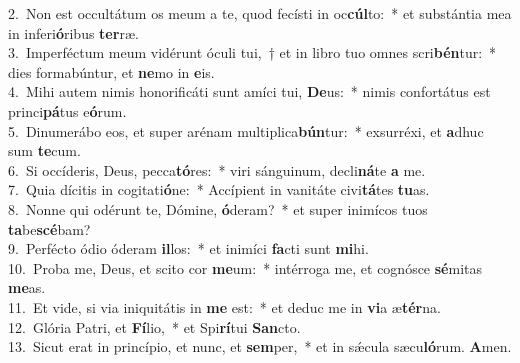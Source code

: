 {2.~}Non est occultátum os meum a te, quod fecísti in oc\textbf{cúl}to:~* et substántia mea in inferi\textbf{ó}ribus \textbf{ter}ræ.\\
{3.~}Imperféctum meum vidérunt óculi tui,~† et in libro tuo omnes scri\textbf{bén}tur:~* dies formabúntur, et \textbf{ne}mo in \textbf{e}is.\\
{4.~}Mihi autem nimis honorificáti sunt amíci tui, \textbf{De}us:~* nimis confortátus est princi\textbf{pá}tus e\textbf{ó}rum.\\
{5.~}Dinumerábo eos, et super arénam multiplica\textbf{bún}tur:~* exsurréxi, et \textbf{a}dhuc sum \textbf{te}cum.\\
{6.~}Si occíderis, Deus, pecca\textbf{tó}res:~* viri sánguinum, decli\textbf{ná}te \textbf{a} me.\\
{7.~}Quia dícitis in cogitati\textbf{ó}ne:~* Accípient in vanitáte civi\textbf{tá}tes \textbf{tu}as.\\
{8.~}Nonne qui odérunt te, Dómine, \textbf{ó}deram?~* et super inimícos tuos \textbf{ta}be\textbf{scé}bam?\\
{9.~}Perfécto ódio óderam \textbf{il}los:~* et inimíci \textbf{fa}cti sunt \textbf{mi}hi.\\
{10.~}Proba me, Deus, et scito cor \textbf{me}um:~* intérroga me, et cognósce \textbf{sé}mitas \textbf{me}as.\\
{11.~}Et vide, si via iniquitátis in \textbf{me} est:~* et deduc me in \textbf{vi}a æ\textbf{tér}na.\\
{12.~}Glória Patri, et \textbf{Fí}lio,~* et Spi\textbf{rí}tui \textbf{San}cto.\\
{13.~}Sicut erat in princípio, et nunc, et \textbf{sem}per,~* et in sǽcula sæcu\textbf{ló}rum. \textbf{A}men.\\
